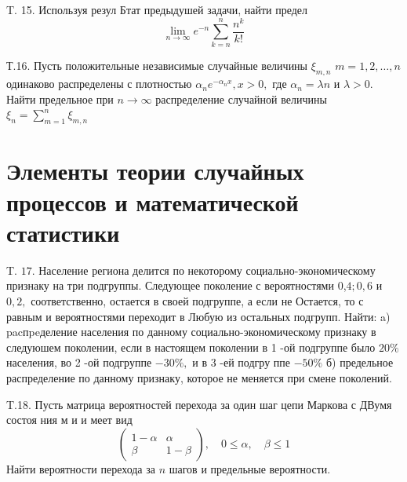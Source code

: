 \documentclass[a4paper,12pt]{article} %
\begin{document}
\begin{example}

T. 15. Используя резул Бтат предыдушей задачи, найти предел
$$
\lim _{n \rightarrow \infty} e^{-n} \sum_{k=n}^{n} \frac{n^{k}}{k !}
$$




\end{example}





\begin{example}

Т.16. Пусть положительные независимые случайные величины $\xi_{m, n}$ $m=1,2, \ldots, n$ одинаково распределены с плотностью $\alpha_{n} e^{-\alpha_{n} x}, x>0,$ где $\alpha_{n}=\lambda n$ и $\lambda>0 .$ Найти предельное при $n \rightarrow \infty$ распределение случайной величины $\xi_{n}=\sum_{m=1}^{n} \xi_{m, n}$




\end{example}


\section{Элементы теории случайных процессов и математической статистики}




\begin{example}


T. $17 .$ Население региона делится по некоторому социально-экономическому признаку на три подгруппы. Следующее поколение с вероятностями 0,$4 ; 0,6$ и $0,2,$ соответственно, остается в своей подгруппе, а если не
Остается, то с равным и вероятностями переходит в Любую из остальных подгрупп. Найти:
a) pacпpeделение населения по данному социально-экономическому признаку в следуюшем поколении, если в настоящем поколении в 1 -ой подгруппе было $20 \%$ населения, во 2 -ой подгруппе $-30 \%,$ и в 3 -ей подгру ппе $-50 \%$
б) предельное распределение по данному признаку, которое не меняется при смене поколений.



\end{example}



\begin{example}

T.18. Пусть матрица вероятностей перехода за один шаг цепи Маркова с
ДВумя состоя ния м и и меет вид
$$
\left(\begin{array}{cc}
1-\alpha & \alpha \\
\beta & 1-\beta
\end{array}\right), \quad 0 \leqslant \alpha, \quad \beta \leqslant 1
$$
Найти вероятности перехода за $n$ шагов и предельные вероятности.




\end{example}
\end{document}
